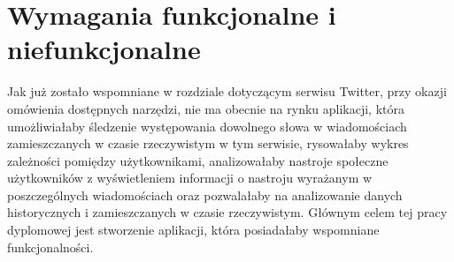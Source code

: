 \chapter{Wymagania funkcjonalne i niefunkcjonalne}
Jak już zostało wspomniane w rozdziale dotyczącym serwisu Twitter, przy okazji omówienia dostępnych narzędzi, nie ma obecnie na rynku aplikacji, która umożliwiałaby śledzenie występowania dowolnego słowa w wiadomościach zamieszczanych w czasie rzeczywistym w tym serwisie, rysowałaby wykres zależności pomiędzy użytkownikami, analizowałaby nastroje społeczne użytkowników z wyświetleniem informacji o nastroju wyrażanym w poszczególnych wiadomościach oraz pozwalałaby na analizowanie danych historycznych i zamieszczanych w czasie rzeczywistym. Głównym celem tej pracy dyplomowej jest stworzenie aplikacji, która posiadałaby wspomniane funkcjonalności.

